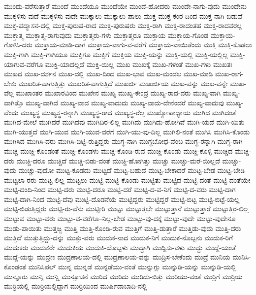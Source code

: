 {ಮುಂದು-ವರೆಸುತ್ತಾರೆ
ಮುಂದೆ
ಮುಂದೆಯೂ
ಮುಂದೆಯೇ
ಮುಂದೆ-ಹೋದರು
ಮುಂದೇ-ನಾಗು-ವುದು
ಮುಂದೇನು
ಮುಕ್ಕಳಿಸು-ವುದೆ
ಮುಕ್ಕಳಿಸು-ವುದೇ
ಮುಕ್ಕಾಲು
ಮುಕ್ಕಾಲು-ಪಾಲು
ಮುಕ್ತ
ಮುಕ್ತ-ಕಂಠ-ದಿಂದ
ಮುಕ್ತ-ನಾಗಿ-ಬಿಡುವೆ
ಮುಕ್ತ-ಪದ್ಮಾಸನ-ದಲ್ಲಿ
ಮುಕ್ತ-ಪುರುಷ-ರಾದ
ಮುಕ್ತ-ಪುರುಷರು
ಮುಕ್ತ-ರಾಗಿ
ಮುಕ್ತ-ರಾದಂತಹ
ಮುಕ್ತ-ರಾದವರಲ್ಲ
ಮುಕ್ತಾತ್ಮ
ಮುಕ್ತಾತ್ಮ-ರಾಗುವುದು
ಮುಕ್ತಾತ್ಮರು-ಗಳು
ಮುಕ್ತಾತ್ಮರೂ
ಮುಕ್ತಾಯ
ಮುಕ್ತಾಯ-ಗೊಂಡ
ಮುಕ್ತಾಯ-ಗೊಳಿಸಿ-ದರು
ಮುಕ್ತಾಯ-ಮಾಡಿ-ದಾಗ
ಮುಕ್ತಾಯ-ವಾಗು-ವ-ವರೆಗೆ
ಮುಕ್ತಾಯ-ವಾಯಿತೆಂದು
ಮುಕ್ತಿ
ಮುಕ್ತಿ-ಕೊಡಲು
ಮುಕ್ತಿ-ಗಾಗಿ
ಮುಕ್ತಿ-ಗಾಗಿಯೂ
ಮುಕ್ತಿಗೂ
ಮುಕ್ತಿಗೆ
ಮುಕ್ತಿಯ
ಮುಕ್ತಿ-ಯನ್ನು
ಮುಕ್ತಿ-ಯಲ್ಲಿ
ಮುಕ್ತಿ-ಯಲ್ಲಿಲ್ಲ
ಮುಕ್ತಿ-ಯಾಗುವ-ವರೆಗೂ
ಮುಕ್ತಿ-ಯಾದಲ್ಲದೆ
ಮುಕ್ತಿ-ಯಿಲ್ಲ
ಮುಖ
ಮುಖಕ್ಕೆ
ಮುಖ-ಗಳಂತೆ
ಮುಖ-ಗಳು
ಮುಖತಃ
ಮುಖದ
ಮುಖ-ದರ್ಶನ
ಮುಖ-ದಲ್ಲಿ
ಮುಖ-ದಿಂದ
ಮುಖ-ಭಾವ
ಮುಖ-ಮಂಡಲ
ಮುಖ-ಮಾಡಿ
ಮುಖ-ರಾಗ-ಬೇಕು
ಮುಖರಿತ-ವಾಗುತ್ತಿತ್ತು
ಮುಖರಿತ-ವಾಗುತ್ತಿದೆ
ಮುಖರ್ಜಿ
ಮುಖರ್ಜಿಯ
ಮುಖ-ವನ್ನು
ಮುಖ-ವನ್ನೇ
ಮುಖ-ವೆಲ್ಲ
ಮುಖಾಂತರ
ಮುಖಾರವಿಂದ
ಮುಖೇನ
ಮುಖ್ಯ
ಮುಖ್ಯ-ಕೇಂದ್ರ
ಮುಖ್ಯ-ರಾದ-ವರು
ಮುಖ್ಯ-ವಾಗಿ
ಮುಖ್ಯ-ವಾಗಿತ್ತೊ
ಮುಖ್ಯ-ವಾಗಿದೆ
ಮುಖ್ಯ-ವಾದ
ಮುಖ್ಯ-ವಾದುದು
ಮುಖ್ಯ-ವಾದು-ದೇನೆಂದರೆ
ಮುಖ್ಯ-ವಾದುವು
ಮುಖ್ಯ-ವೆಂದು
ಮುಖ್ಯಸ್ಥ
ಮುಖ್ಯಸ್ಥ-ರನ್ನಾಗಿ
ಮುಖ್ಯಸ್ಥ-ರಾದ
ಮುಖ್ಯಸ್ಥ-ರೆಲ್ಲ
ಮುಖ್ಯೋಪಾಧ್ಯಾಯ
ಮುಗಿದ
ಮುಗಿದಂತೆ
ಮುಗಿದ-ಮೇಲೆ
ಮುಗಿದರೆ
ಮುಗಿದವು
ಮುಗಿದಿರ-ಲಿಲ್ಲ
ಮುಗಿದು
ಮುಗಿದು-ಹೋಗಿವೆ
ಮುಗಿ-ಯದೆ
ಮುಗಿ-ಯಿತು
ಮುಗಿ-ಯುತ್ತದೆ
ಮುಗಿ-ಯುವ
ಮುಗಿ-ಯುವ-ವರೆಗೆ
ಮುಗಿ-ಯು-ವು-ದಿಲ್ಲ
ಮುಗಿಲಿ-ನಂತೆ
ಮುಗಿಸಿ
ಮುಗಿಸಿ-ಕೊಂಡು
ಮುಗಿಸಿದ
ಮುಗಿಸಿ-ದರು
ಮುಗಿಸಿ-ಬಿಟ್ಟಿ-ರುತ್ತಿದ್ದರು
ಮುಗ್ಧ-ನಾಗಿ
ಮುಗ್ಧಬೋಧ-ವೆಂಬ
ಮುಗ್ಧ-ರನ್ನಾಗಿ
ಮುಗ್ಧ-ರಾಗಿ
ಮುಚ್ಚಿ
ಮುಚ್ಚಿ-ಕೊಂಡಂತೆ
ಮುಚ್ಚಿ-ಕೊಂಡಳು
ಮುಚ್ಚಿ-ಕೊಂಡಿ-ರುವ
ಮುಚ್ಚಿ-ಕೊಂಡು
ಮುಚ್ಚಿ-ಕೊಳ್ಳಿ
ಮುಚ್ಚಿದ
ಮುಚ್ಚಿ-ದರು
ಮುಚ್ಚಿ-ದರೂ
ಮುಚ್ಚಿದೆ
ಮುಚ್ಚಿ-ಬಿಡು-ವಂತೆ
ಮುಚ್ಚಿ-ಹೋಗಿತ್ತು
ಮುಚ್ಚು
ಮುಚ್ಚು-ಮರೆ-ಯಿಲ್ಲದೆ
ಮುಚ್ಚು-ವುದು
ಮುಚ್ಚು-ವುದೋ
ಮುಟ್ಟ-ಕೂಡದು
ಮುಟ್ಟದೆ
ಮುಟ್ಟ-ಬಹುದೆ
ಮುಟ್ಟ-ಬೇಕಾದರೆ
ಮುಟ್ಟ-ಬೇಡ
ಮುಟ್ಟ-ಬೇಡಿ
ಮುಟ್ಟಲಾ-ರರು
ಮುಟ್ಟ-ಲಿಲ್ಲ
ಮುಟ್ಟಲು
ಮುಟ್ಟಿ
ಮುಟ್ಟಿ-ಕೊಂಡು
ಮುಟ್ಟಿತು
ಮುಟ್ಟಿದ
ಮುಟ್ಟಿ-ದಂತೆ
ಮುಟ್ಟಿ-ದಂತೆಯೇ
ಮುಟ್ಟಿ-ದಂದಿ-ನಿಂದ
ಮುಟ್ಟಿ-ದರು
ಮುಟ್ಟಿ-ದರೂ
ಮುಟ್ಟಿ-ದರೆ
ಮುಟ್ಟಿ-ದ-ವ-ನಿಗೆ
ಮುಟ್ಟಿ-ದ-ವರು
ಮುಟ್ಟಿ-ದಾಗ
ಮುಟ್ಟಿ-ದಾಗಿ-ನಿಂದ
ಮುಟ್ಟಿ-ದೆವು
ಮುಟ್ಟಿ-ದೊಡನೆಯೆ
ಮುಟ್ಟಿದ್ದರು
ಮುಟ್ಟಿದ್ದರೆ
ಮುಟ್ಟಿ-ಬಿಟ್ಟ
ಮುಟ್ಟಿ-ಬಿಟ್ಟೆ-ಯಲ್ಲ
ಮುಟ್ಟಿ-ಬಿಡುತ್ತಿದ್ದರು
ಮುಟ್ಟಿ-ರು-ವೆನು
ಮುಟ್ಟೀರಿ
ಮುಟ್ಟು
ಮುಟ್ಟುತ್ತಲೇ
ಮುಟ್ಟುತ್ತಾನೆ
ಮುಟ್ಟುತ್ತಾರೆ
ಮುಟ್ಟುತ್ತಿರ-ಲಿಲ್ಲ
ಮುಟ್ಟುವ
ಮುಟ್ಟು-ವರು
ಮುಟ್ಟು-ವ-ವರೆಗೂ--ನಿಲ್ಲ-ಬೇಡ
ಮುಟ್ಟು-ವು-ದಕ್ಕೆ
ಮುಟ್ಟು-ವುದೇ
ಮುಟ್ಟು-ವುದೇನೂ
ಮುಡು-ಪಾಯಿತು
ಮುತ್ತಜ್ಜ
ಮುತ್ತಿ
ಮುತ್ತಿ-ಕೊಂಡಿ-ರುವ
ಮುತ್ತಿಗೆ
ಮುತ್ತಿ-ಡುತ್ತಾರೆ
ಮುತ್ತಿಡು-ವುದು
ಮುತ್ತಿ-ದರು
ಮುತ್ತಿದೆ
ಮುತ್ತುತ್ತಿದ್ದು-ದನ್ನು
ಮುತ್ತು-ವರು
ಮುದುಕ-ನಾದ
ಮುದುಕ-ನಿಗೆ
ಮುದುಕ-ನೊಬ್ಬನು
ಮುದುಕ-ರಿಗೆ
ಮುದುಕರು
ಮುದುಕರೇ
ಮುದುಕಿಯ
ಮುದುಕಿ-ಯೊಬ್ಬಳು
ಮುದ್ದಾಗಿ
ಮುದ್ದಿಸು-ವಳು
ಮುದ್ದು
ಮುದ್ದೆ-ಯಂತೆ
ಮುದ್ದೆ-ಯನ್ನು
ಮುದ್ರಣ
ಮುದ್ರಣಾಲಯ-ದಲ್ಲಿ
ಮುದ್ರಣಾಲಯ-ವನ್ನು
ಮುದ್ರಿಸ-ಬೇಕೆಂದು
ಮುದ್ರೆ
ಮುನಿಯ
ಮುನಿಸಿ-ಕೊಂಡಂತೆ
ಮುನಿಸಿಪಲ್
ಮುನ್ನ
ಮುನ್ನಡೆ
ಮುನ್ನಡೆಯು-ವಂತೆ
ಮುನ್ನುಗ್ಗು
ಮುನ್ನುಡಿ-ಯನ್ನು
ಮುನ್ನುಡಿ-ಯಲ್ಲಿ
ಮುನ್ನೂರು
ಮುನ್ಶಿ
ಮುನ್ಷಿ
ಮುನ್ಸೂಚನೆ
ಮುರಿದ
ಮುರಿದು
ಮುರಿದು-ಬಿತ್ತು
ಮುರಿಯು-ವಂತೆ
ಮುರ್ರಿಗೆ
ಮುರ್ರಿಯ
ಮುರ್ರಿಯಲ್ಲಿ
ಮುರ್ರಿಯಲ್ಲಿದ್ದಾಗ
ಮುರ್ರಿಯಿಂದ
ಮುರ್ಷಿದಾಬಾದಿ-ನಲ್ಲಿ
}
